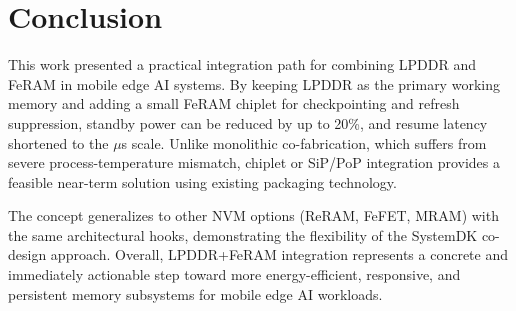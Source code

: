 \section{Conclusion}

This work presented a practical integration path for combining LPDDR and FeRAM in mobile edge AI systems. 
By keeping LPDDR as the primary working memory and adding a small FeRAM chiplet for checkpointing and refresh suppression, 
standby power can be reduced by up to 20\%, and resume latency shortened to the $\mu$s scale. 
Unlike monolithic co-fabrication, which suffers from severe process-temperature mismatch, 
chiplet or SiP/PoP integration provides a feasible near-term solution using existing packaging technology. 

The concept generalizes to other NVM options (ReRAM, FeFET, MRAM) with the same architectural hooks, 
demonstrating the flexibility of the SystemDK co-design approach. 
Overall, LPDDR+FeRAM integration represents a concrete and immediately actionable step 
toward more energy-efficient, responsive, and persistent memory subsystems for mobile edge AI workloads.
